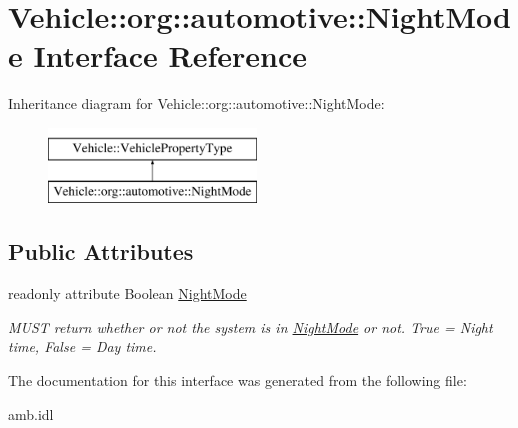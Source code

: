 \hypertarget{interfaceVehicle_1_1org_1_1automotive_1_1NightMode}{\section{Vehicle\-:\-:org\-:\-:automotive\-:\-:Night\-Mode Interface Reference}
\label{interfaceVehicle_1_1org_1_1automotive_1_1NightMode}
}
Inheritance diagram for Vehicle\-:\-:org\-:\-:automotive\-:\-:Night\-Mode\-:\begin{figure}[H]
\begin{center}
\leavevmode
\includegraphics[height=2.000000cm]{interfaceVehicle_1_1org_1_1automotive_1_1NightMode}
\end{center}
\end{figure}
\subsection*{Public Attributes}
\begin{DoxyCompactItemize}
\item 
\hypertarget{interfaceVehicle_1_1org_1_1automotive_1_1NightMode_a23cdbd12af914c0f44eee996f961b012}{readonly attribute Boolean \hyperlink{interfaceVehicle_1_1org_1_1automotive_1_1NightMode_a23cdbd12af914c0f44eee996f961b012}{Night\-Mode}}\label{interfaceVehicle_1_1org_1_1automotive_1_1NightMode_a23cdbd12af914c0f44eee996f961b012}

\begin{DoxyCompactList}\small\item\em M\-U\-S\-T return whether or not the system is in \hyperlink{interfaceVehicle_1_1org_1_1automotive_1_1NightMode}{Night\-Mode} or not. True = Night time, False = Day time. \end{DoxyCompactList}\end{DoxyCompactItemize}


The documentation for this interface was generated from the following file\-:\begin{DoxyCompactItemize}
\item 
amb.\-idl\end{DoxyCompactItemize}
